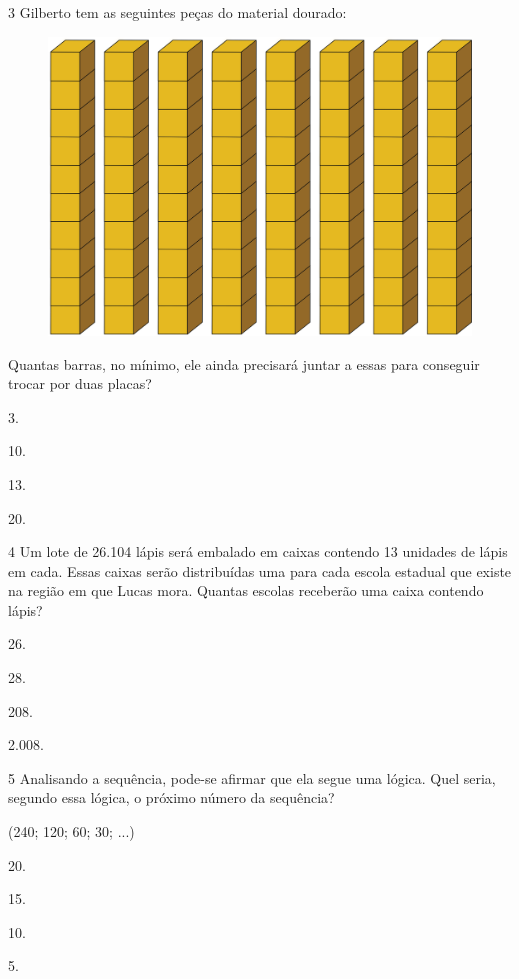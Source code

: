 \num{3} Gilberto tem as seguintes peças do material dourado:

\begin{figure}[htpb!]
\centering
\includegraphics[width=.5\textwidth]{./media/image103.png}
\end{figure}

Quantas barras, no mínimo, ele ainda precisará juntar a essas para conseguir trocar por duas placas?

\begin{escolha}
\item
  3.
\item
  10.
\item
  13.
\item
  20.
\end{escolha}

\num{4} Um lote de 26.104 lápis será embalado em caixas contendo 13 unidades de
lápis em cada. Essas caixas serão distribuídas uma para cada escola
estadual que existe na região em que Lucas mora. Quantas escolas
receberão uma caixa contendo lápis?

\begin{escolha}
\item
  26.
\item
  28.
\item
  208.
\item
  2.008.
\end{escolha}

\num{5} Analisando a sequência, pode-se afirmar que ela segue uma lógica. Quel seria, segundo essa lógica, o próximo número da sequência?

\begin{myquote}
(240; 120; 60; 30; ...)
\end{myquote}

\begin{multicols}{2}
\begin{escolha}
\item
  20.
\item
  15.
\item
  10.
\item
  5.
\end{escolha}
\end{multicols}


